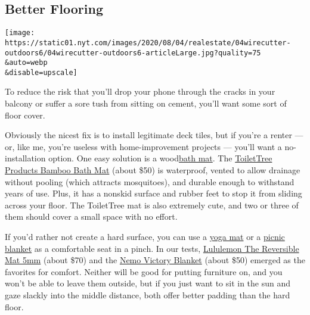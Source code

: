 \hypertarget{better-flooring}{%
\subsection{Better Flooring}\label{better-flooring}}

\texttt{[image: https://static01.nyt.com/images/2020/08/04/realestate/04wirecutter-outdoors6/04wirecutter-outdoors6-articleLarge.jpg?quality=75\\\&auto=webp\\\&disable=upscale]}

To reduce the risk that you'll drop your phone through the cracks in
your balcony or suffer a sore tush from sitting on cement, you'll want
some sort of floor cover.

Obviously the nicest fix is to install legitimate deck tiles, but if
you're a renter --- or, like me, you're useless with home-improvement
projects --- you'll want a no-installation option. One easy solution is
a
wood\href{https://www.nytimes.com/wirecutter/reviews/best-bathroom-rugs-and-bath-mats/?utm_source=nytimes\&utm_medium=referral\&utm_campaign=outdoor-space}{bath
mat}. The
\href{https://www.nytimes.com/wirecutter/reviews/best-bathroom-rugs-and-bath-mats/?utm_source=nytimes\&utm_medium=referral\&utm_campaign=outdoor-space\#a-spa-style-wood-platform-toilettree-products-bamboo-bath-mat}{ToiletTree
Products Bamboo Bath Mat} (about \$50) is waterproof, vented to allow
drainage without pooling (which attracts mosquitoes), and durable enough
to withstand years of use. Plus, it has a nonskid surface and rubber
feet to stop it from sliding across your floor. The ToiletTree mat is
also extremely cute, and two or three of them should cover a small space
with no effort.

If you'd rather not create a hard surface, you can use a
\href{https://www.nytimes.com/wirecutter/reviews/best-yoga-mats/?utm_source=nytimes\&utm_medium=referral\&utm_campaign=outdoor-space}{yoga
mat} or a
\href{https://www.nytimes.com/wirecutter/reviews/best-picnic-blanket/?utm_source=nytimes\&utm_medium=referral\&utm_campaign=outdoor-space}{picnic
blanket} as a comfortable seat in a pinch. In our tests,
\href{https://www.nytimes.com/wirecutter/reviews/best-yoga-mats/?utm_source=nytimes\&utm_medium=referral\&utm_campaign=outdoor-space\#our-pick-lululemon-the-reversible-mat-5mm}{Lululemon
The Reversible Mat 5mm} (about \$70) and the
\href{https://www.nytimes.com/wirecutter/reviews/best-picnic-blanket/?utm_source=nytimes\&utm_medium=referral\&utm_campaign=outdoor-space\#best-overall-picnic-blanket-nemo-victory-blanket}{Nemo
Victory Blanket} (about \$50) emerged as the favorites for comfort.
Neither will be good for putting furniture on, and you won't be able to
leave them outside, but if you just want to sit in the sun and gaze
slackly into the middle distance, both offer better padding than the
hard floor.


